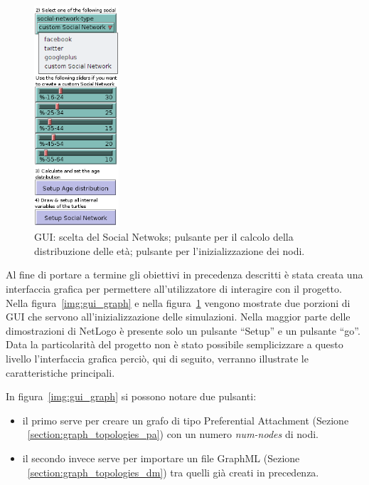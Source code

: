 \begin{figure}
  \vspace*{-35pt}
  \begin{center}
    \includegraphics[width=0.28\textwidth]{img/gui-main.png}
  \end{center}
 \vspace*{-10pt}
 \caption{GUI: 
 scelta del Social Netwoks;
 pulsante per il calcolo della distribuzione delle età;
 pulsante per l'inizializzazione dei nodi.}
 \vspace{-23 mm}
 \label{img:gui_main}
\end{figure}

Al fine di portare a termine gli obiettivi in precedenza descritti è stata creata una interfaccia grafica 
per permettere all'utilizzatore di interagire con il progetto.
Nella figura~\ref{img:gui_graph} e nella figura~\ref{img:gui_main} vengono mostrate due porzioni di GUI che servono 
all'inizializzazione delle simulazioni.
Nella maggior parte delle dimostrazioni di NetLogo è presente solo un pulsante ``Setup'' 
e un pulsante ``go''. Data la particolarità del progetto non è stato possibile semplicizzare a questo livello l'interfaccia grafica 
perciò, qui di seguito, verranno illustrate le caratteristiche principali.


In figura~\ref{img:gui_graph} si possono notare due pulsanti:
\begin{itemize}
 \item il primo serve per creare un grafo di tipo Preferential Attachment 
  (Sezione ~\ref{section:graph_topologies_pa}) con un numero \emph{num-nodes} di nodi.
 \item il secondo invece serve per importare un file GraphML (Sezione ~\ref{section:graph_topologies_dm}) tra 
  quelli già creati in precedenza.
\end{itemize}


